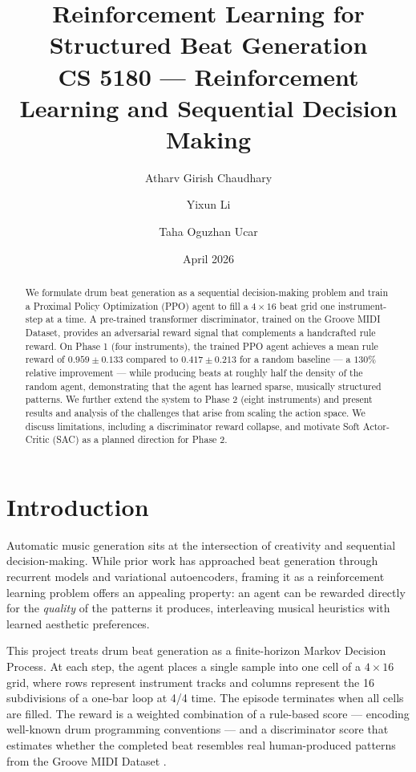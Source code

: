 \documentclass[11pt]{article}
\title{\textbf{Reinforcement Learning for Structured Beat Generation} \\
\large CS 5180 --- Reinforcement Learning and Sequential Decision Making}
\author{Atharv Girish Chaudhary \and Yixun Li \and Taha Oguzhan Ucar}
\date{April 2026}
\begin{document}
\maketitle

\begin{abstract}
We formulate drum beat generation as a sequential decision-making problem and train a Proximal Policy Optimization (PPO) agent to fill a $4 \times 16$ beat grid one instrument-step at a time. A pre-trained transformer discriminator, trained on the Groove MIDI Dataset, provides an adversarial reward signal that complements a handcrafted rule reward. On Phase 1 (four instruments), the trained PPO agent achieves a mean rule reward of $0.959 \pm 0.133$ compared to $0.417 \pm 0.213$ for a random baseline --- a $130\%$ relative improvement --- while producing beats at roughly half the density of the random agent, demonstrating that the agent has learned sparse, musically structured patterns. We further extend the system to Phase 2 (eight instruments) and present results and analysis of the challenges that arise from scaling the action space. We discuss limitations, including a discriminator reward collapse, and motivate Soft Actor-Critic (SAC) as a planned direction for Phase 2.
\end{abstract}

\section{Introduction}

Automatic music generation sits at the intersection of creativity and sequential decision-making. While prior work has approached beat generation through recurrent models and variational autoencoders, framing it as a reinforcement learning problem offers an appealing property: an agent can be rewarded directly for the \textit{quality} of the patterns it produces, interleaving musical heuristics with learned aesthetic preferences.

This project treats drum beat generation as a finite-horizon Markov Decision Process. At each step, the agent places a single sample into one cell of a $4 \times 16$ grid, where rows represent instrument tracks and columns represent the 16 subdivisions of a one-bar loop at 4/4 time. The episode terminates when all cells are filled. The reward is a weighted combination of a rule-based score --- encoding well-known drum programming conventions --- and a discriminator score that estimates whether the completed beat resembles real human-produced patterns from the Groove MIDI Dataset \cite{groove2019}.
\end{document}

